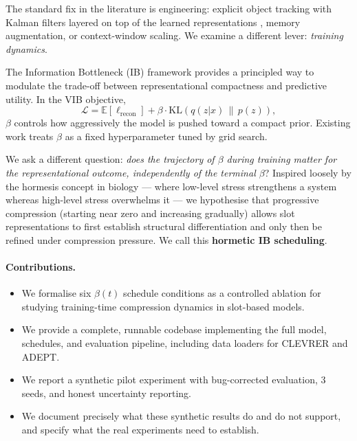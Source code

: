 \documentclass{article}
\begin{document}
The standard fix in the literature is engineering: explicit object tracking with
Kalman filters layered on top of the learned representations
\cite{kipf2021conditional}, memory augmentation, or context-window scaling.
We examine a different lever: \emph{training dynamics}.

The Information Bottleneck (IB) framework \cite{tishby2000information,alemi2017deep}
provides a principled way to modulate the trade-off between representational
compactness and predictive utility.
In the VIB objective,
\begin{equation}
  \mathcal{L} = \mathbb{E}[\ell_\text{recon}] + \beta \cdot \text{KL}(q(z|x)\,\|\,p(z)),
\end{equation}
$\beta$ controls how aggressively the model is pushed toward a compact prior.
Existing work treats $\beta$ as a fixed hyperparameter tuned by grid search.

We ask a different question: \emph{does the trajectory of $\beta$ during training
matter for the representational outcome, independently of the terminal $\beta$}?
Inspired loosely by the hormesis concept in biology --- where low-level stress
strengthens a system whereas high-level stress overwhelms it --- we hypothesise
that progressive compression (starting near zero and increasing gradually) allows
slot representations to first establish structural differentiation and only then
be refined under compression pressure.
We call this \textbf{hormetic IB scheduling}.

\paragraph{Contributions.}
\begin{itemize}
  \item We formalise six $\beta(t)$ schedule conditions as a controlled ablation
        for studying training-time compression dynamics in slot-based models.
  \item We provide a complete, runnable codebase implementing the full model,
        schedules, and evaluation pipeline, including data loaders for CLEVRER
        and ADEPT.
  \item We report a synthetic pilot experiment with bug-corrected evaluation,
        3 seeds, and honest uncertainty reporting.
  \item We document precisely what these synthetic results do and do not support,
        and specify what the real experiments need to establish.
\end{itemize}
\end{document}
